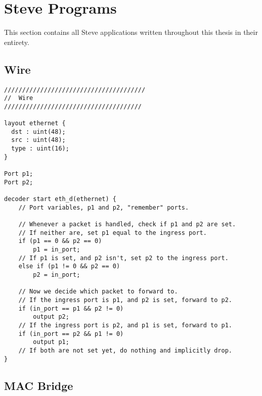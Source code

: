 \section{Steve Programs} \label{ap:steve_programs}

This section contains all Steve applications written throughout this thesis in their entirety.

\subsection{Wire}

\begin{lstlisting}
///////////////////////////////////////
//  Wire
//////////////////////////////////////

layout ethernet {
  dst : uint(48);
  src : uint(48);
  type : uint(16);
}

Port p1;
Port p2;

decoder start eth_d(ethernet) {
	// Port variables, p1 and p2, "remember" ports.

	// Whenever a packet is handled, check if p1 and p2 are set.
	// If neither are, set p1 equal to the ingress port.
	if (p1 == 0 && p2 == 0)
		p1 = in_port;
	// If p1 is set, and p2 isn't, set p2 to the ingress port.
	else if (p1 != 0 && p2 == 0)
		p2 = in_port;

	// Now we decide which packet to forward to.
	// If the ingress port is p1, and p2 is set, forward to p2.
	if (in_port == p1 && p2 != 0)
		output p2;
	// If the ingress port is p2, and p1 is set, forward to p1.
	if (in_port == p2 && p1 != 0)
		output p1;
	// If both are not set yet, do nothing and implicitly drop.
}
\end{lstlisting}

\subsection{MAC Bridge}

